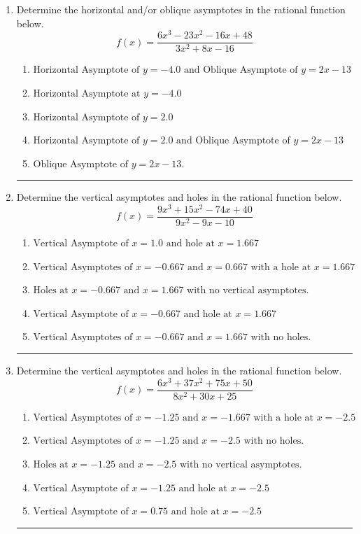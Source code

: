 \documentclass[14pt]{extbook}
\newcommand{\litem}[1]{\item#1\hspace*{-1cm}\rule{\textwidth}{0.4pt}}
\begin{document}
\begin{enumerate}
{\begin{enumerate}[label=\Alph*.]
\end{enumerate} }
\litem{
Determine the horizontal and/or oblique asymptotes in the rational function below.\[ f(x) = \frac{6x^{3} -23 x^{2} -16 x + 48}{3x^{2} +8 x -16} \]\begin{enumerate}[label=\Alph*.]
\item \( \text{Horizontal Asymptote of } y = -4.0 \text{ and Oblique Asymptote of } y = 2x -13 \)
\item \( \text{Horizontal Asymptote at } y = -4.0 \)
\item \( \text{Horizontal Asymptote of } y = 2.0  \)
\item \( \text{Horizontal Asymptote of } y = 2.0 \text{ and Oblique Asymptote of } y = 2x -13 \)
\item \( \text{Oblique Asymptote of } y = 2x -13. \)

\end{enumerate} }
\litem{
Determine the vertical asymptotes and holes in the rational function below.\[ f(x) = \frac{9x^{3} +15 x^{2} -74 x + 40}{9x^{2} -9 x -10} \]\begin{enumerate}[label=\Alph*.]
\item \( \text{Vertical Asymptote of } x = 1.0 \text{ and hole at } x = 1.667 \)
\item \( \text{Vertical Asymptotes of } x = -0.667 \text{ and } x = 0.667 \text{ with a hole at } x = 1.667 \)
\item \( \text{Holes at } x = -0.667 \text{ and } x = 1.667 \text{ with no vertical asymptotes.} \)
\item \( \text{Vertical Asymptote of } x = -0.667 \text{ and hole at } x = 1.667 \)
\item \( \text{Vertical Asymptotes of } x = -0.667 \text{ and } x = 1.667 \text{ with no holes.} \)

\end{enumerate} }
\litem{
Determine the vertical asymptotes and holes in the rational function below.\[ f(x) = \frac{6x^{3} +37 x^{2} +75 x + 50}{8x^{2} +30 x + 25} \]\begin{enumerate}[label=\Alph*.]
\item \( \text{Vertical Asymptotes of } x = -1.25 \text{ and } x = -1.667 \text{ with a hole at } x = -2.5 \)
\item \( \text{Vertical Asymptotes of } x = -1.25 \text{ and } x = -2.5 \text{ with no holes.} \)
\item \( \text{Holes at } x = -1.25 \text{ and } x = -2.5 \text{ with no vertical asymptotes.} \)
\item \( \text{Vertical Asymptote of } x = -1.25 \text{ and hole at } x = -2.5 \)
\item \( \text{Vertical Asymptote of } x = 0.75 \text{ and hole at } x = -2.5 \)


\end{enumerate}}
\end{enumerate}
\end{document}
